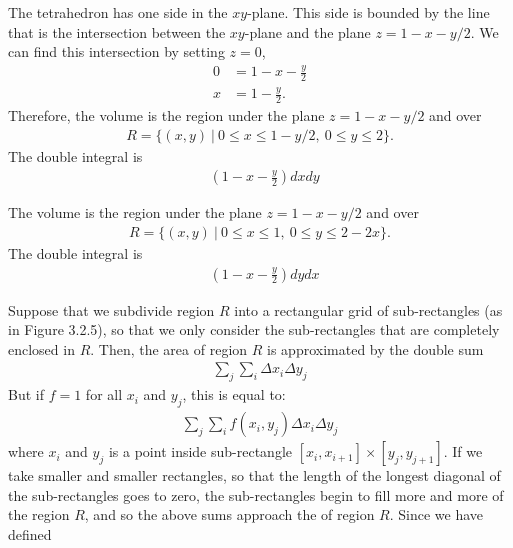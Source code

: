 \documentclass{article}
\begin{document}
\item The tetrahedron has one side in the $xy$-plane. This side is bounded by the line that is the intersection between the $xy$-plane and the plane $z = 1 - x - y/2$. We can find this intersection by setting $z=0$,
\begin{align*}
  0 &= 1 - x - \frac{y}{2} \\
  x &= 1 - \frac{y}{2}.
\end{align*}
Therefore, the volume is the region under the plane $z = 1 - x - y/2$ and over  
\begin{align*}
  R = \{ (x,y) \ | \ 0 \le x \le 1- y/2, \ 0 \le y \le 2 \}.
\end{align*}
The double integral is 
\begin{align*}
  \mathop{\int_{0}^{2} \! \int_0^{1-y/2} } (1 - x - \frac{y}{2}) dxdy
\end{align*} 
\item The volume is the region under the plane $z = 1 - x - y/2$ and over  
\begin{align*}
  R = \{ (x,y) \ | \ 0 \le x \le 1, \ 0 \le y \le 2 - 2x \}.
\end{align*}
The double integral is 
\begin{align*}
  \mathop{\int_{0}^{1} \! \int_0^{2-2x} } (1 - x - \frac{y}{2}) dydx
\end{align*} 
\EEN
\item %
\BEN
\item
Suppose that we subdivide region $R$ into a rectangular grid of sub-rectangles (as in Figure 3.2.5), so that we only consider the sub-rectangles that are completely enclosed in $R$. Then, the area of region $R$ is approximated by the double sum
\begin{align*}
  \sum_j\sum_i\Delta x_i \Delta y_j
\end{align*}
But if $f=1$ for all $x_i$ and $y_j$, this is equal to:
\begin{align}\label{abefaberabreabr}
  \sum_j\sum_i f(x_i,y_j) \Delta x_i \Delta y_j
\end{align}
where $x_i$ and $y_j$ is a point inside sub-rectangle $[x_i,x_{i+1}]\times[y_j,y_{j+1}]$. 
If we take smaller and smaller rectangles, so that the length of the longest diagonal of the sub-rectangles goes to zero, the sub-rectangles begin to fill more and more of the region $R$, and so the above sums approach the   of region $R$. Since we have defined
\end{document}
